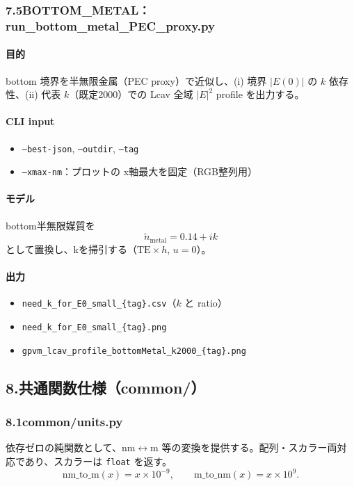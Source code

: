 \documentclass[a4paper,11pt]{jsarticle} %
\begin{document}
\subsubsection*{7.5\;BOTTOM\_METAL：run\_bottom\_metal\_PEC\_proxy.py}
\paragraph{目的}
bottom 境界を半無限金属（PEC proxy）で近似し、(i) 境界 $|E(0)|$ の $k$ 依存性、(ii) 代表 $k$（既定2000）での Lcav 全域 $|E|^2$ profile を出力する。

\paragraph{CLI input}
\begin{itemize}
\item \texttt{--best-json}, \texttt{--outdir}, \texttt{--tag}
\item \texttt{--xmax-nm}：プロットの x軸最大を固定（RGB整列用）
\end{itemize}

\paragraph{モデル}
bottom半無限媒質を
\[
\tilde n_{\mathrm{metal}}=0.14+ik
\]
として置換し、kを掃引する（$\mathrm{TE}\times h$, $u=0$）。

\paragraph{出力}
\begin{itemize}
\item \texttt{need\_k\_for\_E0\_small\_\{tag\}.csv}（$k$ と ratio）
\item \texttt{need\_k\_for\_E0\_small\_\{tag\}.png}
\item \texttt{gpvm\_lcav\_profile\_bottomMetal\_k2000\_\{tag\}.png}
\end{itemize}

\subsection*{8.\;共通関数仕様（common/）}
\subsubsection*{8.1\;common/units.py}
依存ゼロの純関数として、nm$\leftrightarrow$m 等の変換を提供する。配列・スカラー両対応であり、スカラーは \texttt{float} を返す。
\[
\mathrm{nm\_to\_m}(x)=x\times 10^{-9},\qquad
\mathrm{m\_to\_nm}(x)=x\times 10^{9}.
\]
\end{document}

